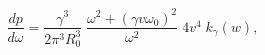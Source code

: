 \begin{equation} \label{hsB} 
\frac{d p}{d\omega}= 
\frac{\gamma ^3}{2\pi ^3 R_{0}^{3}}\; 
\frac{\omega ^2+(\gamma v \omega _{0})^2}{\omega ^2}\; 
4v^4 \; k_{\gamma}(w), 
\end{equation} 
